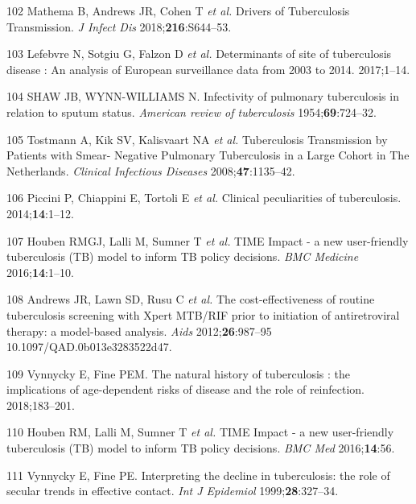 \documentclass[11pt,twoside]{bristolthesis}
\begin{document}
  \leavevmode\hypertarget{ref-Mathema2018}{}%
  102 Mathema B, Andrews JR, Cohen T \emph{et al.} Drivers of Tuberculosis Transmission. \emph{J Infect Dis} 2018;\textbf{216}:S644--53.
  
  \leavevmode\hypertarget{ref-Lefebvre2017}{}%
  103 Lefebvre N, Sotgiu G, Falzon D \emph{et al.} Determinants of site of tuberculosis disease : An analysis of European surveillance data from 2003 to 2014. 2017;1--14.
  
  \leavevmode\hypertarget{ref-PMID:13148535}{}%
  104 SHAW JB, WYNN-WILLIAMS N. Infectivity of pulmonary tuberculosis in relation to sputum status. \emph{American review of tuberculosis} 1954;\textbf{69}:724--32.
  
  \leavevmode\hypertarget{ref-Tostmann2008}{}%
  105 Tostmann A, Kik SV, Kalisvaart NA \emph{et al.} Tuberculosis Transmission by Patients with Smear- Negative Pulmonary Tuberculosis in a Large Cohort in The Netherlands. \emph{Clinical Infectious Diseases} 2008;\textbf{47}:1135--42.
  
  \leavevmode\hypertarget{ref-Piccini2014}{}%
  106 Piccini P, Chiappini E, Tortoli E \emph{et al.} Clinical peculiarities of tuberculosis. 2014;\textbf{14}:1--12.
  
  \leavevmode\hypertarget{ref-Houben2016}{}%
  107 Houben RMGJ, Lalli M, Sumner T \emph{et al.} TIME Impact - a new user-friendly tuberculosis (TB) model to inform TB policy decisions. \emph{BMC Medicine} 2016;\textbf{14}:1--10.
  
  \leavevmode\hypertarget{ref-Andrews2012}{}%
  108 Andrews JR, Lawn SD, Rusu C \emph{et al.} The cost-effectiveness of routine tuberculosis screening with Xpert MTB/RIF prior to initiation of antiretroviral therapy: a model-based analysis. \emph{Aids} 2012;\textbf{26}:987--95 10.1097/QAD.0b013e3283522d47.
  
  \leavevmode\hypertarget{ref-Vynnycky1997}{}%
  109 Vynnycky E, Fine PEM. The natural history of tuberculosis : the implications of age-dependent risks of disease and the role of reinfection. 2018;183--201.
  
  \leavevmode\hypertarget{ref-Houben2016a}{}%
  110 Houben RM, Lalli M, Sumner T \emph{et al.} TIME Impact - a new user-friendly tuberculosis (TB) model to inform TB policy decisions. \emph{BMC Med} 2016;\textbf{14}:56.
  
  \leavevmode\hypertarget{ref-Vynnycky1999}{}%
  111 Vynnycky E, Fine PE. Interpreting the decline in tuberculosis: the role of secular trends in effective contact. \emph{Int J Epidemiol} 1999;\textbf{28}:327--34.
  
\end{document}
